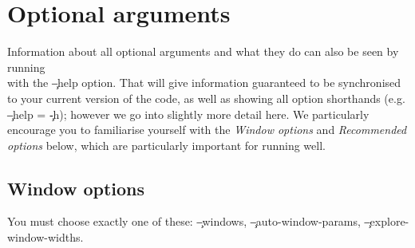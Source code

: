\section{Optional arguments}

Information about all optional arguments and what they do can also be seen by running \\\pmt with the \c{--help} option.
That will give information guaranteed to be synchronised to your current version of the code, as well as showing all option shorthands (e.g. \c{--help} = \c{-h}); however we go into slightly more detail here.
We particularly encourage you to familiarise yourself with the {\it Window options} and {\it Recommended options} below, which are particularly important for running \pmt well.

\subsection{Window options}
You must choose exactly one of these: \c{--windows}, \c{--auto-window-params}, \c{--explore-window-widths}.
